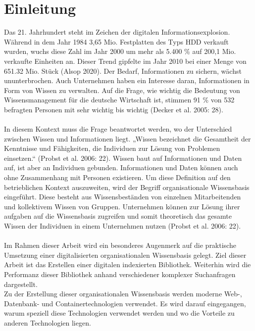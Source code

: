 \documentclass[a4paper]{scrartcl}
\begin{document}
\listoftables


\newpage

\setcounter{page}{1}


\section{Einleitung}
Das 21. Jahrhundert steht im Zeichen der digitalen Informationsexplosion. Während in dem Jahr 1984 3,65 Mio. Festplatten des Typs HDD verkauft wurden, wuchs diese Zahl im Jahr 2000 um mehr als 5.400 \% auf 200,1 Mio. verkaufte Einheiten an. Dieser Trend gipfelte im Jahr 2010 bei einer Menge von 651.32 Mio. Stück (Alsop 2020). Der Bedarf, Informationen zu sichern, wächst ununterbrochen. Auch Unternehmen haben ein Interesse daran, Informationen in Form von Wissen zu verwalten. Auf die Frage, wie wichtig die Bedeutung von Wissensmanagement für die deutsche Wirtschaft ist, stimmen 91 \% von 532 befragten Personen mit sehr wichtig bis wichtig (Decker et al. 2005: 28). \\ \\
In diesem Kontext muss die Frage beantwortet werden, wo der Unterschied zwischen Wissen und Informationen liegt. „Wissen bezeichnet die Gesamtheit der Kenntnisse und Fähigkeiten, die Individuen zur Lösung von Problemen einsetzen.“ (Probst et al. 2006: 22). Wissen baut auf Informationen und Daten auf, ist aber an Individuen gebunden. Informationen und Daten können auch ohne Zusammenhang mit Personen existieren. Um diese Definition auf den betrieblichen Kontext auszuweiten, wird der Begriff organisationale Wissensbasis eingeführt. Diese besteht aus Wissensbeständen von einzelnen Mitarbeitenden und kollektivem Wissen von Gruppen. Unternehmen können zur Lösung ihrer aufgaben auf die Wissensbasis zugreifen und somit theoretisch das gesamte Wissen der Individuen in einem Unternehmen nutzen (Probst et al. 2006: 22). \\ \\
Im Rahmen dieser Arbeit wird ein besonderes Augenmerk auf die praktische Umsetzung einer digitalisierten organisationalen Wissensbasis gelegt. Ziel dieser Arbeit ist das Erstellen einer digitalen indexierten Bibliothek. Weiterhin wird die Performanz dieser Bibliothek anhand verschiedener komplexer Suchanfragen dargestellt. \\
Zu der Erstellung dieser organisationalen Wissensbasis werden moderne Web-, Datenbank- und Containertechnologien verwendet. Es wird darauf eingegangen, warum speziell diese Technologien verwendet werden und wo die Vorteile zu anderen Technologien liegen.
\end{document}
